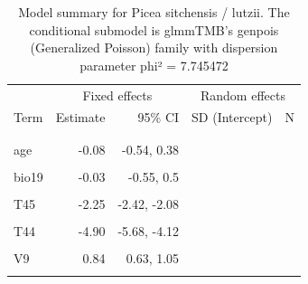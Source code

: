 \documentclass[
]{article}
\begin{document}
\begin{longtable}[t]{lrrrr}
\caption{\label{tab:summaries-tables}\label{tab:Ps}Model summary for Picea sitchensis / lutzii. The conditional submodel is glmmTMB's genpois (Generalized Poisson) family with dispersion parameter phi² = 7.745472}\\
\toprule
\multicolumn{1}{c}{ } & \multicolumn{2}{c}{Fixed effects} & \multicolumn{2}{c}{Random effects} \\
\cmidrule(l{3pt}r{3pt}){2-3} \cmidrule(l{3pt}r{3pt}){4-5}
Term & Estimate & 95\% CI & SD (Intercept) & N\\
\midrule
\addlinespace[0.3em]
\multicolumn{5}{l}{\textbf{Conditional model}}\\
\hspace{1em}\cellcolor{gray!6}{Intercept} & \cellcolor{gray!6}{-1.80} & \cellcolor{gray!6}{-2.28, -1.31} & \cellcolor{gray!6}{} & \cellcolor{gray!6}{}\\
\hspace{1em}age & -0.08 & -0.54, 0.38 &  & \\
\hspace{1em}\cellcolor{gray!6}{bio01} & \cellcolor{gray!6}{0.54} & \cellcolor{gray!6}{0.01, 1.08} & \cellcolor{gray!6}{} & \cellcolor{gray!6}{}\\
\hspace{1em}bio19 & -0.03 & -0.55, 0.5 &  & \\
\hspace{1em}\cellcolor{gray!6}{relelev} & \cellcolor{gray!6}{-0.12} & \cellcolor{gray!6}{-0.19, -0.05} & \cellcolor{gray!6}{} & \cellcolor{gray!6}{}\\
\hspace{1em}T45 & -2.25 & -2.42, -2.08 &  & \\
\hspace{1em}\cellcolor{gray!6}{artificial} & \cellcolor{gray!6}{-1.07} & \cellcolor{gray!6}{-1.27, -0.87} & \cellcolor{gray!6}{} & \cellcolor{gray!6}{}\\
\hspace{1em}T44 & -4.90 & -5.68, -4.12 &  & \\
\hspace{1em}\cellcolor{gray!6}{T32} & \cellcolor{gray!6}{-1.24} & \cellcolor{gray!6}{-1.42, -1.06} & \cellcolor{gray!6}{} & \cellcolor{gray!6}{}\\
\hspace{1em}V9 & 0.84 & 0.63, 1.05 &  & \\
\hspace{1em}\cellcolor{gray!6}{T34} & \cellcolor{gray!6}{0.15} & \cellcolor{gray!6}{0.01, 0.29} & \cellcolor{gray!6}{} & \cellcolor{gray!6}{}\\

\end{longtable}
\end{document}
